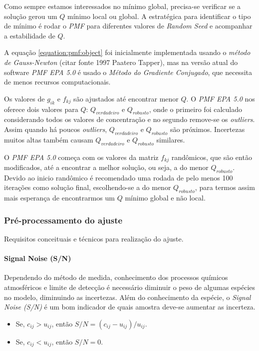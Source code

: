 Como sempre estamos interessados no mínimo global, precisa-se verificar se a 
solução gerou um $Q$ mínimo local ou global. A estratégica para identificar
o tipo de mínimo é rodar o \textit{PMF} para diferentes valores de 
\textit{Random Seed} e acompanhar a estabilidade de $Q$.

A equação \ref{equation:pmf:object} foi inicialmente implementada usando 
o \textit{método de Gauss-Newton}  (citar fonte 1997 Paatero Tapper), mas na 
versão atual do software \textit{PMF EPA 5.0} é usado o 
\textit{Método do Gradiente Conjugado}, que necessita de menos recursos 
computacionais. 

Os valores de $g_{ik}$ e $f_{kj}$ são ajustados até encontrar menor $Q$. 
O \textit{PMF EPA 5.0} nos oferece dois valores para $Q$: $Q_{verdadeiro}$ e 
$Q_{robusto}$, onde o primeiro foi calculado considerando todos os valores 
de concentração e no segundo remove-se os \textit{outliers}.
Assim quando há poucos \textit{outliers}, $Q_{verdadeiro}$ e $Q_{robusto}$ 
são próximos. Incertezas muitos altas também causam $Q_{verdadeiro}$ e 
$Q_{robusto}$ similares.

O \textit{PMF EPA 5.0} começa com os valores da matriz $f_{kj}$ randômicos, 
que são então modificados, até a encontrar a melhor solução, ou seja, 
a do menor $Q_{robusto}$. 
Devido ao inicio randômico é recomendado uma rodada de pelo menos 100 iterações 
como solução final, escolhendo-se a do menor $Q_{robusto}$, para termos assim 
mais esperança de encontrarmos um $Q$ mínimo global e não local.

\subsubsection{Pré-processamento do ajuste}
Requisitos conceituais e técnicos para realização do ajuste.

\paragraph{Signal Noise (S/N)}

Dependendo do método de medida, conhecimento dos processos químicos 
atmosféricos e limite de detecção é necessário diminuir o peso de algumas 
espécies no modelo, diminuindo as incertezas. 
Além do conhecimento da espécie, o \textit{Signal Noise (S/N)} é um bom 
indicador de quais amostra deve-se aumentar as incerteza.

\begin{itemize}
  \item Se, $c_{ij} >  u_{ij}$, então $ S/N = (c_{ij} - u_{ij})/u_{ij}$.
  \item Se, $c_{ij} <  u_{ij}$, então $S/N = 0 $.
\end{itemize}

